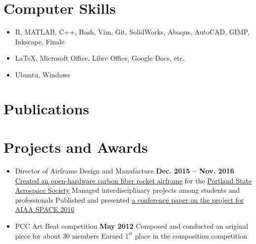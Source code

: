 \documentclass[letterpaper]{article}
\begin{document}
\section{Computer Skills}
\begin{center}
\begin{itemize}
\item R, MATLAB, C++, Bash, Vim, Git, SolidWorks, Abaqus, AutoCAD, GIMP, Inkscape, Finale
\item \LaTeX, Microsoft Office, Libre Office, Google Docs, etc.
\item Ubuntu, Windows
\end{itemize}
% 
% 
\end{center}



\section*{Publications}


\section{Projects and Awards}
\begin{center}
\begin{itemize}
\item Director of Airframe Design and Manufacture
	\hfill\textbf{Dec. 2015 -- Nov. 2016} %
	\subitem \href{https://github.com/psas/sw-cad-airframe-lv3.0}{Created 
		an open-hardware carbon fiber rocket airframe} for the 
		\href{http://psas.pdx.edu/}{Portland State Aerospace Society}
	\subitem Managed interdisciplinary projects among students and professionals
	\subitem Published and presented \href{http://arc.aiaa.org/doi/pdf/10.2514/6.2016-5365}{a conference paper on the project for AIAA SPACE 2016}
\item PCC Art Beat competition \hfill\textbf{May 2012}
	\subitem Composed and conducted an original piece for about 30 members
	\subitem Earned $1^\text{st}$ place in the composition competition
\end{itemize}
\end{center}
\end{document}
